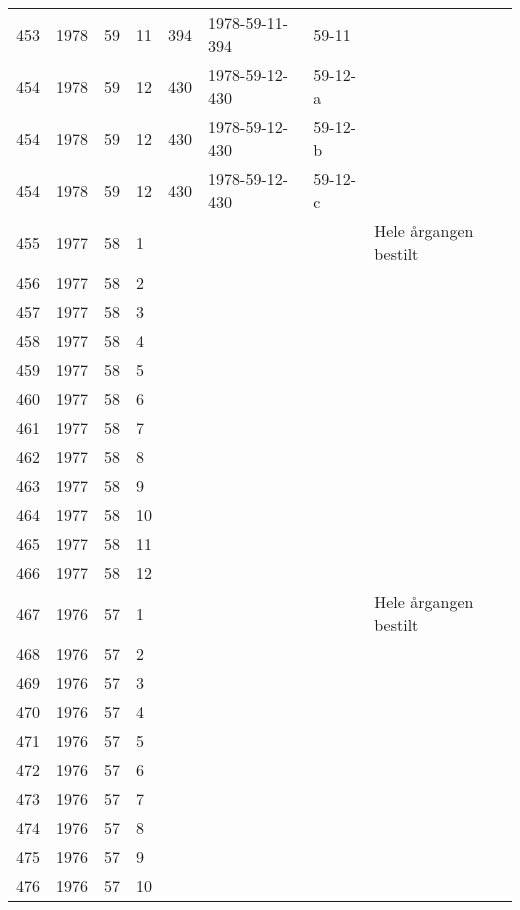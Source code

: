 \begin{longtable}{ |l|l|l|l|l|l|l|l| }
453 & 1978 & 59 &    11 &     394 & 1978-59-11-394 & 59-11 & \\
454 & 1978 & 59 &    12 &     430 & 1978-59-12-430 & 59-12-a & \\
454 & 1978 & 59 &    12 &     430 & 1978-59-12-430 & 59-12-b & \\
454 & 1978 & 59 &    12 &     430 & 1978-59-12-430 & 59-12-c & \\
455 & 1977 & 58 &     1 &         &                &  & Hele årgangen bestilt \\
456 & 1977 & 58 &     2 &         &                &  & \\
457 & 1977 & 58 &     3 &         &                &  & \\
458 & 1977 & 58 &     4 &         &                &  & \\
459 & 1977 & 58 &     5 &         &                &  & \\
460 & 1977 & 58 &     6 &         &                &  & \\
461 & 1977 & 58 &     7 &         &                &  & \\
462 & 1977 & 58 &     8 &         &                &  & \\
463 & 1977 & 58 &     9 &         &                &  & \\
464 & 1977 & 58 &    10 &         &                &  & \\
465 & 1977 & 58 &    11 &         &                &  & \\
466 & 1977 & 58 &    12 &         &                &  & \\
467 & 1976 & 57 &     1 &         &                &  & Hele årgangen bestilt\\
468 & 1976 & 57 &     2 &         &                &  & \\
469 & 1976 & 57 &     3 &         &                &  & \\
470 & 1976 & 57 &     4 &         &                &  & \\
471 & 1976 & 57 &     5 &         &                &  & \\
472 & 1976 & 57 &     6 &         &                &  & \\
473 & 1976 & 57 &     7 &         &                &  & \\
474 & 1976 & 57 &     8 &         &                &  & \\
475 & 1976 & 57 &     9 &         &                &  & \\
476 & 1976 & 57 &    10 &         &                &  & \\

\end{longtable}
